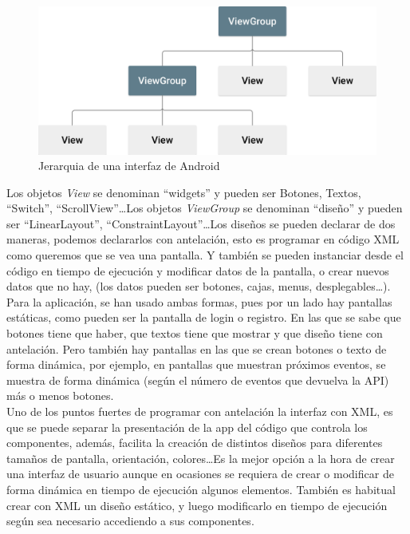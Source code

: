 \begin{figure}[h!]
  \centering
  \includegraphics[width=0.75\linewidth]{figs/Desarrollo/Jerarquia}
  \caption[Android Layout]{Jerarquia de una interfaz de Android}
  \label{fig:interfaz_android}
\end{figure}

Los objetos \emph{View} se denominan ``widgets'' y pueden ser Botones, Textos, ``Switch'', ``ScrollView''\dots Los objetos \emph{ViewGroup} se denominan ``diseño'' y pueden ser ``LinearLayout'', ``ConstraintLayout''\dots Los diseños se pueden declarar de dos maneras, podemos declararlos con antelación, esto es programar en código XML como queremos que se vea una pantalla. Y también se pueden instanciar desde el código en tiempo de ejecución y modificar datos de la pantalla, o crear nuevos datos que no hay, (los datos pueden ser botones, cajas, menus, desplegables\dots). \\

Para la aplicación, se han usado ambas formas, pues por un lado hay pantallas estáticas, como pueden ser la pantalla de login o registro. En las que se sabe que botones tiene que haber, que textos tiene que mostrar y que diseño tiene con antelación. Pero también hay pantallas en las que se crean botones o texto de forma dinámica, por ejemplo, en pantallas que muestran próximos eventos, se muestra de forma dinámica (según el número de eventos que devuelva la API) más o menos botones. \\

Uno de los puntos fuertes de programar con antelación la interfaz con XML, es que se puede separar la presentación de la app del código que controla los componentes, además, facilita la creación de distintos diseños para diferentes tamaños de pantalla, orientación, colores\dots Es la mejor opción a la hora de crear una interfaz de usuario aunque en ocasiones se requiera de crear o modificar de forma dinámica en tiempo de ejecución algunos elementos. También es habitual crear con XML un diseño estático, y luego modificarlo en tiempo de ejecución según sea necesario accediendo a sus componentes.  


